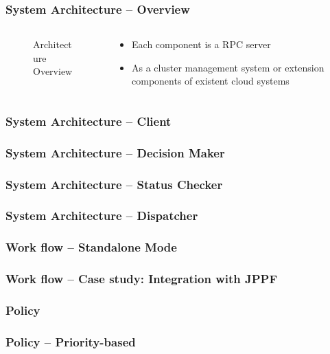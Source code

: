 \documentclass{beamer}
\begin{document}
\begin{frame}
  \frametitle{System Architecture -- Overview}
  \begin{columns}
    \begin{column}{.5\textwidth}
      \begin{figure}
        \resizebox{\linewidth}{!}{
          
        }
        \caption{Architecture Overview}
        \label{fig:archi-overview}
      \end{figure}
    \end{column}
    \begin{column}{.5\textwidth}
      \begin{itemize}
        \item Each component is a RPC server
        \item As a cluster management system or extension
          components of existent cloud systems
      \end{itemize}
    \end{column}
  \end{columns}
\end{frame}
\begin{frame}
  \frametitle{System Architecture -- Client}
\end{frame}
\begin{frame}
  \frametitle{System Architecture -- Decision Maker}
\end{frame}
\begin{frame}
  \frametitle{System Architecture -- Status Checker}
\end{frame}
\begin{frame}
  \frametitle{System Architecture -- Dispatcher}
\end{frame}
\begin{frame}
  \frametitle{Work flow -- Standalone Mode}
\end{frame}
\begin{frame}
  \frametitle{Work flow -- Case study: Integration with JPPF}
\end{frame}
\begin{frame}
  \frametitle{Policy}
\end{frame}
\begin{frame}
  \frametitle{Policy -- Priority-based}
\end{frame}
\end{document}

